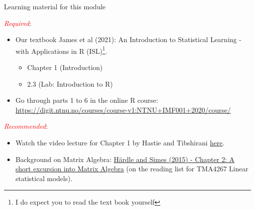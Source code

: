 \documentclass[
  10pt,
  ignorenonframetext,
]{beamer}
\providecommand{\tightlist}{%
  \setlength{\itemsep}{0pt}\setlength{\parskip}{0pt}}
\begin{document}
\begin{frame}
\begin{block}{Learning material for this module}
\protect\hypertarget{learning-material-for-this-module}{}
\(~\)

\emph{\textcolor{red}{Required}}:

\vspace{1mm}

\begin{itemize}
\tightlist
\item
  Our textbook James et al (2021): An Introduction to Statistical
  Learning - with Applications in R
  (ISL)\footnote{I do expect you to read the text book yourself}.

  \begin{itemize}
  \tightlist
  \item
    Chapter 1 (Introduction)
  \item
    2.3 (Lab: Introduction to R)
  \end{itemize}
\end{itemize}

\vspace{2mm}

\begin{itemize}
\tightlist
\item
  Go through parts 1 to 6 in the online R course:
  \url{https://digit.ntnu.no/courses/course-v1:NTNU+IMF001+2020/course/}
\end{itemize}

\vspace{3mm}

\emph{\textcolor{red}{Recommended}}:

\vspace{1mm}

\begin{itemize}
\item
  Watch the video lecture for Chapter 1 by Hastie and Tibshirani
  \href{https://wiki.math.ntnu.no/tma4268/2023v/subpage1}{here}.
\item
  Background on Matrix Algebra:
  \href{https://link.springer.com/chapter/10.1007/978-3-662-45171-7_2}{Härdle
  and Simes (2015) - Chapter 2: A short excursion into Matrix Algebra}
  (on the reading list for TMA4267 Linear statistical models).
\end{itemize}
\end{block}
\end{frame}
\end{document}
